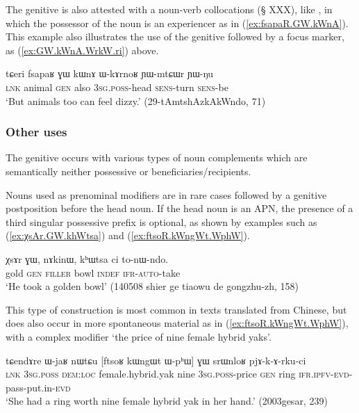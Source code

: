 The genitive is also attested with a noun-verb collocations (§ XXX), like , in which the possessor  of the noun is an experiencer as in (\ref{ex:fsapaR.GW.kWnA}). This example also illustrates the use of the genitive followed by a focus marker, as (\ref{ex:GW.kWnA.WrkW.ri}) above.

\begin{exe}
\ex \label{ex:fsapaR.GW.kWnA}
\gll tɕeri fsapaʁ ɣɯ kɯnɤ ɯ-kɤrnoʁ ɲɯ-mtɕɯr ɲɯ-ŋu \\
\textsc{lnk} animal \textsc{gen} also \textsc{3sg}.\textsc{poss}-head \textsc{sens}-turn \textsc{sens}-be \\
\glt `But animals too can feel dizzy.' (29-tAmtshAzkAkWndo, 71)
\end{exe}


\subsubsection{Other uses} \label{sec:gen.other}
The genitive  occurs with various types of noun complements which are semantically neither possessive or beneficiaries/recipients. 

Nouns used as prenominal modifiers are in rare cases followed by a genitive postposition before the head noun. If the head noun is an APN, the presence of a third singular possessive prefix  is optional, as shown by examples such as (\ref{ex:χsAr.GW.khWtsa}) and (\ref{ex:ftsoR.kWngWt.WphW}). 

\begin{exe}
\ex \label{ex:χsAr.GW.khWtsa}
\gll  χsɤr ɣɯ, nɤkinɯ, kʰɯtsa ci to-nɯ-ndo. \\
gold \textsc{gen} \textsc{filler} bowl \textsc{indef} \textsc{ifr}-\textsc{auto}-take \\
\glt `He took a golden bowl' (140508 shier ge tiaowu de gongzhu-zh, 158)
\end{exe}

This type of construction is most common in texts translated from Chinese, but does also occur in more spontaneous material as in (\ref{ex:ftsoR.kWngWt.WphW}), with a complex modifier  `the price of nine female hybrid yaks'.

\begin{exe}
\ex \label{ex:ftsoR.kWngWt.WphW}
\gll tɕendɤre ɯ-jaʁ nɯtɕu [ftsoʁ kɯngɯt ɯ-pʰɯ] ɣɯ srɯnloʁ pjɤ-k-ɤ-rku-ci \\
\textsc{lnk} \textsc{3sg}.\textsc{poss} \textsc{dem}:\textsc{loc} female.hybrid.yak nine \textsc{3sg}.\textsc{poss}-price \textsc{gen} ring \textsc{ifr}.\textsc{ipfv}-\textsc{evd}-pass-put.in-\textsc{evd} \\
\glt `She had a ring worth nine female hybrid yak in her hand.' (2003gesar, 239)
\end{exe}

